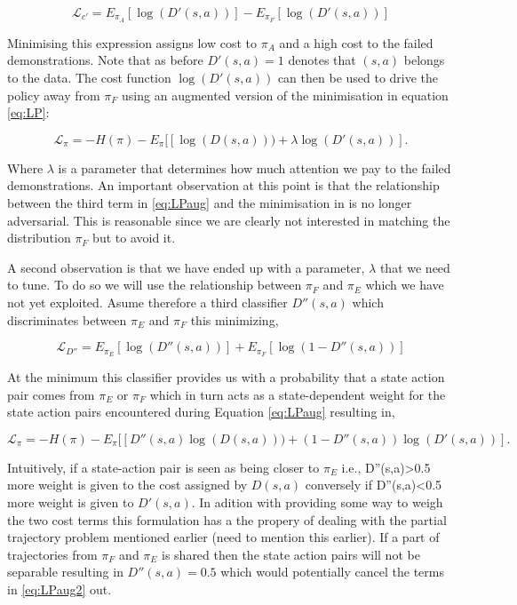 \documentclass[letterpaper, 10 pt, conference]{ieeeconf}
\begin{document}
\begin{equation}
  \mathcal{L}_{c'} = E_{\pi_A}[\log(D'(s,a))] - E_{\pi_F}[\log(D'(s,a))] \label{eq:LCp}
\end{equation}

Minimising this expression assigns low cost to $\pi_A$ and a high cost to the failed demonstrations. Note that as before $D'(s,a)=1$ denotes that $(s,a)$ belongs to the data. The cost function $\log(D'(s,a))$ can then be used to drive the policy away from $\pi_F$ using an augmented version of the minimisation in equation \ref{eq:LP}:

\begin{equation}
  \mathcal{L}_{\pi} = -H(\pi) -E_{\pi}[[\log(D(s,a))) + \lambda \log(D'(s,a))].  \label{eq:LPaug}
\end{equation}

Where $\lambda$ is a parameter that determines how much attention we pay to the failed demonstrations. An important observation at this point is that the relationship between the third term in \ref{eq:LPaug} and the minimisation in \label{eq:LCp} is no longer adversarial. This is reasonable since we are clearly not interested in matching the distribution $\pi_F$ but to avoid it. 

A second observation is that we have ended up with a parameter, $\lambda$ that we need to tune. To do so we will use the relationship between $\pi_F$ and $\pi_E$ which we have not yet exploited. Asume therefore a third classifier $D''(s,a)$ which discriminates between $\pi_E$ and $\pi_F$ this minimizing,

\begin{equation}
  \mathcal{L}_{D''} = E_{\pi_E}[\log(D''(s,a))] + E_{\pi_F}[\log(1-D''(s,a))] \label{eq:LCpp}
\end{equation}

At the minimum this classifier provides us with a probability that a state action pair comes from $\pi_E$ or $\pi_F$ which in turn acts as a state-dependent weight for the state action pairs encountered during Equation \ref{eq:LPaug} resulting in,

\begin{equation}
  \mathcal{L}_{\pi} = -H(\pi) -E_{\pi}[[ D''(s,a) \log(D(s,a))) + (1-D''(s,a)) \log(D'(s,a))].  \label{eq:LPaug2}
\end{equation}

Intuitively, if a state-action pair is seen as being closer to $\pi_E$ i.e., D''(s,a)>0.5 more weight is given to the cost assigned by $D(s,a)$ conversely if D''(s,a)<0.5 more weight is given to $D'(s,a)$. In adition with providing some way to weigh the two cost terms this formulation has a the propery of dealing with the partial trajectory problem mentioned earlier (need to mention this earlier). If a part of trajectories from $\pi_F$ and $\pi_E$ is shared then the state action pairs will not be separable resulting in  $D''(s,a)=0.5$ which would potentially cancel the terms in \ref{eq:LPaug2} out.
\end{document}
